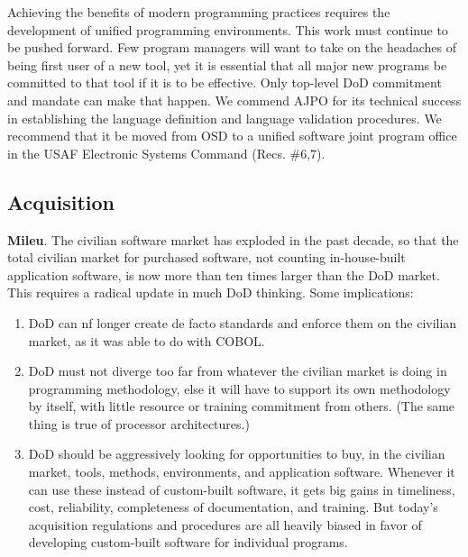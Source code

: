 \documentclass[12pt]{article}
\begin{document}
Achieving the benefits of modern programming practices requires the development of
unified programming environments. This work must continue to be pushed forward.
Few program managers will want to take on the headaches of being first user of a new
tool, yet it is essential that all major new programs be committed to that tool if it is to
be effective. Only top-level DoD commitment and mandate can make that happen.
We commend AJPO for its technical success in establishing the language definition and
language validation procedures. We recommend that it be moved from OSD to a unified
software joint program office in the USAF Electronic Systems Command (Recs. \#6,7).

\subsection*{Acquisition}

\textbf{Mileu}. The civilian software market has exploded in the past decade, so that the total
civilian market for purchased software, not counting in-house-built application software, is
now more than ten times larger than the DoD market. This requires a radical update in
much DoD thinking. Some implications:

\begin{enumerate}
\item DoD can nf longer create de facto standards and enforce them on the civilian market,
as it was able to do with COBOL.

\item DoD must not diverge too far from whatever the civilian market is doing in programming methodology, else it will have to support its own methodology by itself, with little
resource or training commitment from others. (The same thing is true of processor
architectures.)

\item DoD should be aggressively looking for opportunities to buy, in the civilian market,
tools, methods, environments, and application software. Whenever it can use these
instead of custom-built software, it gets big gains in timeliness, cost, reliability,
completeness of documentation, and training. But today's acquisition regulations
and procedures are all heavily biased in favor of developing custom-built software
for individual programs.
\end{enumerate}
\end{document}
